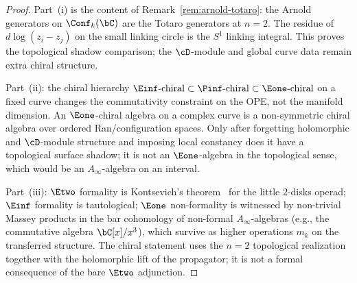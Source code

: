 \begin{proof}
Part~(i) is the content of Remark~\ref{rem:arnold-totaro}:
the Arnold generators on $\Conf_k(\bC)$ are the Totaro generators
at $n = 2$. The residue of $d\log(z_i-z_j)$ on the small linking
circle is the $S^1$ linking integral. This proves the topological
shadow comparison; the $\cD$-module and global curve data remain
extra chiral structure.

Part~(ii): the chiral hierarchy
$\Einf\text{-chiral} \subset \Pinf\text{-chiral} \subset
\Eone\text{-chiral}$ on a fixed curve changes the commutativity
constraint on the OPE, not the manifold dimension. An
$\Eone$-chiral algebra on a complex curve is a non-symmetric
chiral algebra over ordered Ran/configuration spaces. Only after
forgetting holomorphic and $\cD$-module structure and imposing
local constancy does it have a topological surface shadow; it is
not an $\Eone$-algebra in the topological sense, which would be an
$A_\infty$-algebra on an interval.

Part~(iii): $\Etwo$ formality is Kontsevich's theorem~\cite{Kon99}
for the little $2$-disks operad; $\Einf$ formality is tautological;
$\Eone$ non-formality is witnessed by non-trivial Massey products
in the bar cohomology of non-formal $A_\infty$-algebras (e.g., the
commutative algebra $\bC[x]/x^3$), which survive as higher
operations $m_k$ on the transferred structure. The chiral statement
uses the $n = 2$ topological realization together with the
holomorphic lift of the propagator; it is not a formal consequence
of the bare $\Etwo$ adjunction.
\end{proof}

